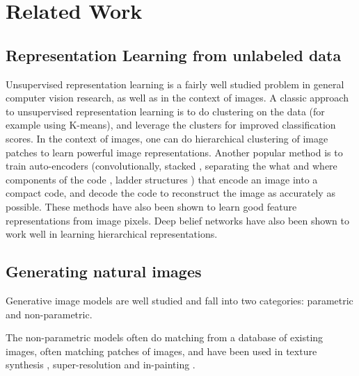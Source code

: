 \section{Related Work}
\subsection{Representation Learning from unlabeled data}
Unsupervised representation learning is a fairly well studied problem in general computer vision research, as well as in the context of images. A classic approach to unsupervised representation learning is to do clustering on the data (for example using K-means), and leverage the clusters for improved classification scores. In the context of images, one can do hierarchical clustering of image patches \citep{coates2012learning} to learn powerful image representations. Another popular method is to train auto-encoders (convolutionally, stacked \citep{vincent2010stacked}, separating the what and where components of the code \citep{zhao2015stacked}, ladder structures \citep{rasmus2015semi}) that encode an image into a compact code, and decode the code to reconstruct the image as accurately as possible. These methods have also been shown to learn good feature representations from image pixels. Deep belief networks \citep{lee2009convolutional} have also been shown to work well in learning hierarchical representations.

\subsection{Generating natural images}

Generative image models are well studied and fall into two categories: parametric and non-parametric.

The non-parametric models often do matching from a database of existing images, often matching patches of images, and have been used in texture synthesis \citep{efros1999texture}, super-resolution \citep{freeman2002example} and in-painting \citep{hays2007scene}.

